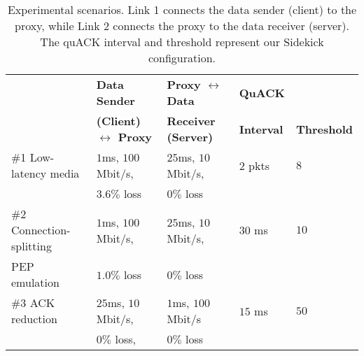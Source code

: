 \begin{table*}[h]
  \centering
  \small
  \begin{tabular}{lllll}
    \toprule
    & \bf Data Sender  & \bf Proxy $\leftrightarrow$ Data & \bf QuACK     & \\
    & \bf (Client) $\leftrightarrow$ Proxy & \bf Receiver (Server) & \bf Interval & \bf Threshold \\
    \midrule
    \#1 Low-latency media & $1$ms, $100$ Mbit/s, & $25$ms, $10$ Mbit/s, & $2$ pkts & $8$ \\
                          & $3.6\%$ loss         & $0\%$ loss           &          &     \\

    \#2 Connection-splitting & $1$ms, $100$ Mbit/s, & $25$ms, $10$ Mbit/s, & $30$ ms & $10$ \\
    PEP emulation            & $1.0\%$ loss         & $0\%$ loss           &         & \\

    \#3 ACK reduction & $25$ms, $10$ Mbit/s, & $1$ms, $100$ Mbit/s & $15$ ms & $50$ \\
                      & $0\%$ loss,          & $0\%$ loss          &         & \\
    \bottomrule
  \end{tabular}
  \caption{Experimental scenarios. Link 1 connects the data sender (client) to
  the proxy, while Link 2 connects the proxy to the data receiver (server).
  The quACK interval and threshold represent our Sidekick configuration.
  }
  \label{tab:experimental-scenarios}
\end{table*}
